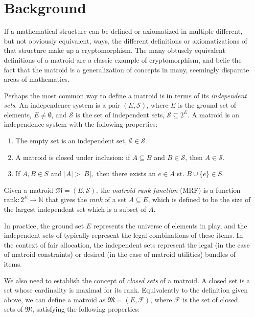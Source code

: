 \chapter{Background}
If a mathematical structure can be defined or axiomatized in multiple different, but not obviously equivalent, ways, the different definitions or axiomatizations of that structure make up a cryptomorphism. The many obtusely equivalent definitions of a matroid are a classic example of cryptomorphism, and belie the fact that the matroid is a generalization of concepts in many, seemingly disparate areas of mathematics.

Perhaps the most common way to define a matroid is in terms of its \textit{independent sets}. An independence system is a pair $(E, \mathcal{S})$, where $E$ is the ground set of elements, $E \not= \emptyset$, and $\mathcal{S}$ is the set of independent sets, $\mathcal{S} \subseteq 2^E$. A matroid is an independence system with the following properties:

\begin{enumerate}
  \item The empty set is an independent set, $\emptyset \in \mathcal{S}$.
  \item A matroid is closed under inclusion: if $A \subseteq B$ and $B \in \mathcal{S}$, then $A \in \mathcal{S}$.
  \item If $A, B \in S$ and $|A| > |B|,$ then there exists an $e \in A$ st. $B \cup \{e\} \in S$.
\end{enumerate}

Given a matroid $\mathfrak{M} = (E, \mathcal{S})$, the \textit{matroid rank function} (MRF) is a function $\text{rank} : 2^E \to \mathbb{N}$ that gives the \textit{rank} of a set $ A \subseteq E$, which is defined to be the size of the largest independent set which is a subset of $A$. 

In practice, the ground set $E$ represents the universe of elements in play, and the independent sets of typically represent the legal combinations of these items. In the context of fair allocation, the independent sets represent the legal (in the case of matroid constraints) or desired (in the case of matroid utilities) bundles of items.

We also need to establish the concept of \textit{closed sets} of a matroid. A closed set is a set whose cardinality is maximal for its rank. Equivalently to the definition given above, we can define a matroid as $\mathfrak{M} = (E, \mathcal{F})$, where $\mathcal{F}$ is the set of closed sets of $\mathfrak{M}$, satisfying the following properties:

